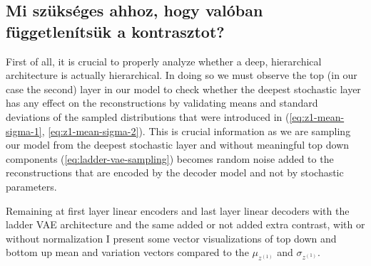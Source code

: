 \documentclass[12pt, english]{article}
\begin{document}
\newpage

\subsection{Mi szükséges ahhoz, hogy valóban függetlenítsük a kontrasztot?}

\vspace{5mm}

\par First of all, it is crucial to properly analyze whether a deep, hierarchical architecture is actually hierarchical. In doing so we must observe the top (in our case the second) layer in our model to check whether the deepest stochastic layer has any effect on the reconstructions by validating means and standard deviations of the sampled distributions that were introduced in (\ref{eq:z1-mean-sigma-1}, \ref{eq:z1-mean-sigma-2}). This is crucial information as we are sampling our model from the deepest stochastic layer and without meaningful top down components (\ref{eq:ladder-vae-sampling}) becomes random noise added to the reconstructions that are encoded by the decoder model and not by stochastic parameters.

\vspace{4mm}

\par Remaining at first layer linear encoders and last layer linear decoders with the ladder VAE architecture and the same added or not added extra contrast, with or without normalization I present some vector visualizations of top down and bottom up mean and variation vectors compared to the $\mu_{z^{(1)}}$ and $\sigma_{z^{(1)}}$.

\vspace{4mm}
\end{document}
